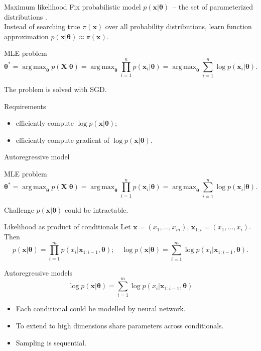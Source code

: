 \documentclass{beamer}
\newcommand{\bx}{\mathbf{x}}
\newcommand{\bX}{\mathbf{X}}
\newcommand{\btheta}{\boldsymbol{\theta}}
\DeclareMathOperator*{\argmax}{arg\,max}
\begin{document}
\begin{frame}{Maximum likelihood}
    Fix probabilistic model $p(\bx | \btheta)$~-- the set of parameterized distributions . \\
    Instead of searching true $\pi(\bx)$ over all probability distributions, learn function approximation $p(\bx | \btheta) \approx \pi(\bx)$.
    
    \begin{block}{MLE problem}
    \vspace{-0.3cm}
    \[
        \btheta^* = \argmax_{\btheta} p(\bX | \btheta) = \argmax_{\btheta} \prod_{i=1}^n p(\bx_i | \btheta) = \argmax_{\btheta} \sum_{i=1}^n \log p(\bx_i | \btheta).
    \]
    \vspace{-0.1cm}
    \end{block}
    
    The problem is solved with SGD.
    \begin{block}{Requirements}
        \begin{itemize}
            \item efficiently compute $\log p(\bx | \btheta)$;
            \item efficiently compute gradient of $\log p(\bx | \btheta)$.
        \end{itemize}
    \end{block}
\end{frame}
\begin{frame}{Autoregressive model}
    \begin{block}{MLE problem}
    \vspace{-0.3cm}
    \[
        \btheta^* = \argmax_{\btheta} p(\bX | \btheta) = \argmax_{\btheta} \prod_{i=1}^n p(\bx_i | \btheta) = \argmax_{\btheta} \sum_{i=1}^n \log p(\bx_i | \btheta).
    \]
    \vspace{-0.1cm}
    \end{block}
    \begin{block}{Challenge}
    $p(\bx | \btheta)$ could be intractable.
    \end{block}
    \begin{block}{Likelihood as product of conditionals}
    Let $\bx = (x_1, \dots, x_m)$, $\bx_{1:i} = (x_1, \dots, x_i)$. Then 
    \[
        p(\bx | \btheta) = \prod_{i=1}^m p(x_i | \bx_{1:i - 1}, \btheta); \quad 
        \log p(\bx | \btheta) = \sum_{i=1}^m \log p(x_i | \bx_{1:i - 1}, \btheta).
    \]
    \end{block}
\end{frame}
\begin{frame}{Autoregressive models}
    \[
    \log p(\bx| \btheta) = \sum_{i=1}^m \log p(x_i | \bx_{1:i - 1}, \btheta)
    \]
    \begin{itemize}
        \item Each conditional could be modelled by neural network.
        \item To extend to high dimensions share parameters across conditionals.
        \item Sampling is sequential.
    \end{itemize}
    
\end{frame}
\end{document}
